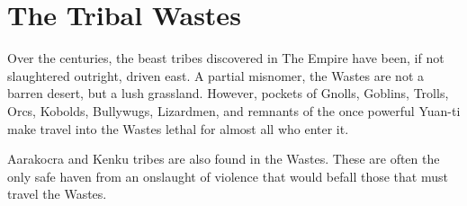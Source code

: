 \section{The Tribal Wastes}

Over the centuries, the beast tribes discovered in The Empire have been,
 if not slaughtered outright, driven east.
A partial misnomer, the Wastes are not a barren desert, but a lush grassland.
However, pockets of Gnolls, Goblins, Trolls, Orcs, Kobolds, Bullywugs, Lizardmen, and
 remnants of the once powerful Yuan-ti make travel into the Wastes lethal for almost
 all who enter it.

Aarakocra and Kenku tribes are also found in the Wastes.
These are often the only safe haven from an onslaught of violence that would befall those
 that must travel the Wastes.
